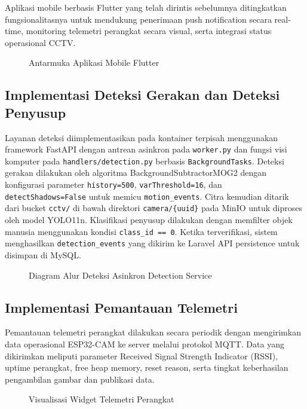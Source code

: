 Aplikasi mobile berbasis Flutter yang telah dirintis sebelumnya ditingkatkan fungsionalitasnya untuk mendukung penerimaan push notification secara real-time, monitoring telemetri perangkat secara visual, serta integrasi status operasional CCTV.

\begin{figure}[H]
\caption{Antarmuka Aplikasi Mobile Flutter}
\label{fig:flutter_app}
\end{figure}

\subsection{Implementasi Deteksi Gerakan dan Deteksi Penyusup}

Layanan deteksi diimplementasikan pada kontainer terpisah menggunakan framework FastAPI dengan antrean asinkron pada \texttt{worker.py} dan fungsi visi komputer pada \texttt{handlers/detection.py} berbasis \texttt{BackgroundTasks}. Deteksi gerakan dilakukan oleh algoritma BackgroundSubtractorMOG2 dengan konfigurasi parameter \texttt{history=500}, \texttt{varThreshold=16}, dan \texttt{detectShadows=False} untuk memicu \texttt{motion\_events}. Citra kemudian ditarik dari bucket \texttt{cctv/} di bawah direktori \texttt{camera/\{uuid\}} pada MinIO untuk diproses oleh model YOLO11n. Klasifikasi penyusup dilakukan dengan memfilter objek manusia menggunakan kondisi \texttt{class\_id == 0}. Ketika terverifikasi, sistem menghasilkan \texttt{detection\_events} yang dikirim ke Laravel API persistence untuk disimpan di MySQL.

\begin{figure}[H]
\caption{Diagram Alur Deteksi Asinkron Detection Service}
\label{fig:detection_service}
\end{figure}

\subsection{Implementasi Pemantauan Telemetri}

Pemantauan telemetri perangkat dilakukan secara periodik dengan mengirimkan data operasional ESP32-CAM ke server melalui protokol MQTT. Data yang dikirimkan meliputi parameter Received Signal Strength Indicator (RSSI), uptime perangkat, free heap memory, reset reason, serta tingkat keberhasilan pengambilan gambar dan publikasi data.

\begin{figure}[H]
\caption{Visualisasi Widget Telemetri Perangkat}
\label{fig:telemetry_widget}
\end{figure}

